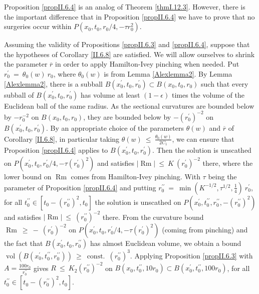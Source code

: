 \documentclass[12pt]{amsart}
\newcommand{\const}{\operatorname{const.}}
\newcommand{\Rm}{\operatorname{Rm}}
\newcommand{\vol}{\operatorname{vol}}
\numberwithin{equation}{section}
\theoremstyle{plain}
\theoremstyle{definition}
\theoremstyle{remark}
\begin{document}
Proposition \ref{propII.6.4} is an analog of Theorem \ref{thmI.12.3}. However, 
there is the important difference that in Proposition \ref{propII.6.4}
we have to prove that no surgeries occur within
$P(x_0, t_0, r_0/4, - \tau r_0^2)$.


Assuming the validity of Propositions \ref{propII.6.3} and \ref{propII.6.4},
suppose that the hypotheses of Corollary \ref{II.6.8} are satisfied.
We will allow ourselves to shrink the parameter $\overline{r}$ in order
to apply Hamilton-Ivey pinching when needed.
Put $r_0^\prime \: = \: \theta_0(w) \: r_0$, where $\theta_0(w)$ is
from Lemma \ref{Alexlemma2}.
By Lemma \ref{Alexlemma2}, there is a subball $B(x_0^\prime, t_0, r_0^\prime) \subset
B(x_0, t_0, r_0)$ such that every subball of
$B(x_0^\prime,t_0, r_0^\prime)$ has volume at least
$(1-\epsilon)$ times the volume of the Euclidean ball of the same
radius.  As the sectional curvatures are bounded below by $- r_0^{-2}$ on
$B(x_0, t_0, r_0)$, they are bounded below by $- (r_0^\prime)^{-2}$ on
$B(x^\prime_0, t_0, r_0^\prime)$. By an appropriate choice of the
parameters $\theta(w)$ and $\overline{r}$ of Corollary \ref{II.6.8},
in particular taking $\theta(w) \: \le \: \frac{\theta_0(w)}{2C_1}$, we can
ensure that Proposition \ref{propII.6.4} 
applies to $B(x^\prime_0, t_0, r_0^\prime)$.
Then the solution is unscathed on
$P(x_0^\prime, t_0, r_0^\prime/4, - \tau (r_0^\prime)^2)$ and satisfies
$|\Rm| \: \le \: K \: (r_0^\prime)^{-2}$ there, where the lower
bound on $\Rm$ comes from Hamilton-Ivey pinching. 
With $\tau$ being the parameter of Proposition \ref{propII.6.4} and
putting
$r_0^{\prime \prime} \: = \: \min(K^{-1/2}, \tau^{1/2}, \frac14) \: r_0^\prime$,
for all $t_0^{\prime \prime} \in 
[t_0 - (r_0^{\prime \prime})^2, t_0]$ the
solution is unscathed on $P(x_0^\prime, t_0^{\prime \prime}, 
r_0^{\prime \prime}, -(r_0^{\prime \prime})^2)$ and satisfies
$|\Rm| \: \le \: (r_0^{\prime \prime})^{-2}$ there.
From the curvature bound $\Rm \: \ge \: - \: (r_0^\prime)^{-2}$ on 
$P(x_0^\prime, t_0, r_0^\prime/4, - \tau (r_0^\prime)^2)$
(coming from pinching)
and the fact that $B(x^\prime_0, t_0, r_0^{\prime \prime})$
has almost Euclidean volume, we obtain a bound 
$\vol(B(x^\prime_0, t_0^{\prime \prime}, 
r_0^{\prime \prime})) \: \ge \: \const \:
(r_0^{\prime \prime})^{3}$. 
Applying Proposition \ref{propII.6.3} with
$A = \frac{100r_0}{r_0^{\prime \prime}}$ gives 
$R \: \le \: K_2 (r_0^{\prime \prime})^{-2}$ on
$B(x_0, t_0^{\prime \prime}, 10 r_0) \subset
B(x_0^\prime, t_0^{\prime \prime}, 100 r_0)$,
for all $t_0^{\prime \prime} \in 
[t_0 - (r_0^{\prime \prime})^2, t_0]$.
\end{document}
